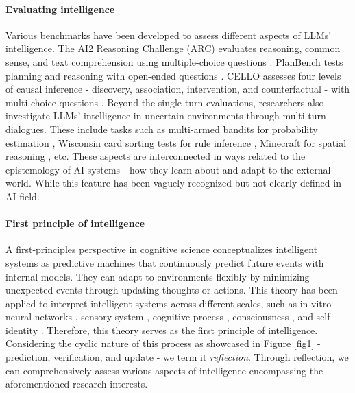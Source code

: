 \paragraph{Evaluating intelligence} Various benchmarks have been developed to assess different aspects of LLMs' intelligence. The AI2 Reasoning Challenge (ARC) evaluates reasoning, common sense, and text comprehension using multiple-choice questions \cite{clark2018think}. PlanBench tests planning and reasoning with open-ended questions \cite{valmeekam2024planbench}. CELLO assesses four levels of causal inference - discovery, association, intervention, and counterfactual - with multi-choice questions \cite{chen2024cellocausalevaluationlarge}. Beyond the single-turn evaluations, researchers also investigate LLMs' intelligence in uncertain environments through multi-turn dialogues. These include tasks such as multi-armed bandits for probability estimation \cite{krishnamurthy2024can}, Wisconsin card sorting tests for rule inference \cite{kennedy2024cognitive}, Minecraft for spatial reasoning \cite{madge2024llmbenchmarkbasedminecraft}, etc. These aspects are interconnected in ways related to the epistemology of AI systems - how they learn about and adapt to the external world. While this feature has been vaguely recognized but not clearly defined in AI field. 

\paragraph{First principle of intelligence} A first-principles perspective in cognitive science conceptualizes intelligent systems as predictive machines that continuously predict future events with internal models\cite{friston2010free}. They can adapt to environments flexibly by minimizing unexpected events through updating thoughts or actions. This theory has been applied to interpret intelligent systems across different scales, such as in vitro neural networks \cite{isomura2023experimental}, sensory system \cite{huang2011predictive}, cognitive process \cite{spratling2016predictive}, consciousness \cite{solms2019hard}, and self-identity \cite{li2024enabling}. Therefore, this theory serves as the first principle of intelligence. Considering the cyclic nature of this process as showcased in Figure \ref{fig1} - prediction, verification, and update - we term it \textit{reflection}. Through reflection, we can comprehensively assess various aspects of intelligence encompassing the aforementioned research interests. 

